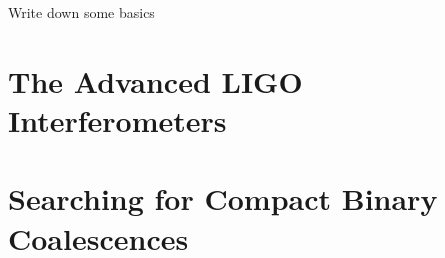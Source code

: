 Write down some basics

\section{The Advanced LIGO Interferometers}

\section{Searching for Compact Binary Coalescences}
